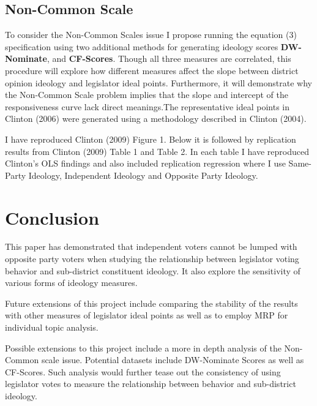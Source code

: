 \documentclass[10pt,letterpaper]{article}
\begin{document}
\newpage


\subsection{Non-Common Scale}
To consider the Non-Common Scales issue I propose running the equation (3) specification using two additional methods for generating ideology scores \textbf{DW-Nominate}, and \textbf{CF-Scores}. Though all three measures are correlated, this procedure will explore how different measures affect the slope between district opinion ideology and legislator ideal points. Furthermore, it will demonstrate why the Non-Common Scale problem implies that the slope and intercept of the responsiveness curve lack direct meanings.The representative ideal points in Clinton (2006) were generated using a methodology described in Clinton (2004).


I have reproduced Clinton (2009) Figure 1. Below it is followed by replication results from Clinton (2009) Table 1 and Table 2. In each table I have reproduced Clinton's OLS findings and also included replication regression where I use Same-Party Ideology, Independent Ideology and Opposite Party Ideology.













\newpage
%

\newpage


\newpage

\newpage


\section{Conclusion} 
This paper has demonstrated that independent voters cannot be lumped with opposite party voters when studying the relationship between legislator voting behavior and sub-district constituent ideology. It also explore the sensitivity of various forms of ideology measures.

Future extensions of this project include comparing the stability of the results with other measures of legislator ideal points as well as to employ MRP for individual topic analysis.

Possible extensions to this project include a more in depth analysis of the Non-Common scale issue. Potential datasets include DW-Nominate Scores as well as CF-Scores. Such analysis would further tease out the consistency of using legislator votes to measure the relationship between behavior and sub-district ideology.
\end{document}
